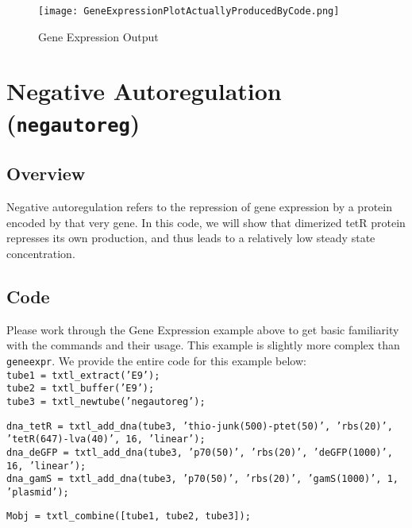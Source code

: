 		
		\begin{figure}
		\begin{center}
		\texttt{[image: GeneExpressionPlotActuallyProducedByCode.png]} 
		\caption{Gene Expression Output}
		\label{fig:geneexpr}
		\end{center}
		
		\end{figure}
		
	\section{Negative Autoregulation (\texttt{negautoreg})}
		\subsection{Overview}
		Negative autoregulation refers to the repression of gene expression by a protein encoded by that very gene. In this code, we will show that dimerized tetR protein represses its own production, and thus leads to a relatively low steady state concentration. 
		\subsection{Code}
		Please work through the Gene Expression example above to get basic familiarity with the commands and their usage. This example is slightly more complex than \texttt{geneexpr}. We provide the entire code for this example below: \\
		
		\noindent \texttt{tube1 = txtl\_extract('E9');} \\
								\texttt{tube2 = txtl\_buffer('E9');} \\
								\texttt{tube3 = txtl\_newtube('negautoreg');} 
								\vspace*{1\baselineskip}
								
								\noindent \texttt{dna\_tetR = txtl\_add\_dna(tube3, 'thio-junk(500)-ptet(50)', 'rbs(20)', 'tetR(647)-lva(40)', 16, 'linear'); }\\
								\texttt{dna\_deGFP = txtl\_add\_dna(tube3, 'p70(50)', 'rbs(20)', 'deGFP(1000)', 16, 'linear');}\\
								\texttt{dna\_gamS = txtl\_add\_dna(tube3, 'p70(50)', 'rbs(20)', 'gamS(1000)', 1, 'plasmid');}
								\vspace*{1\baselineskip}
								
								\noindent \texttt{Mobj = txtl\_combine([tube1, tube2, tube3]);} 
								\vspace*{1\baselineskip}	
								
